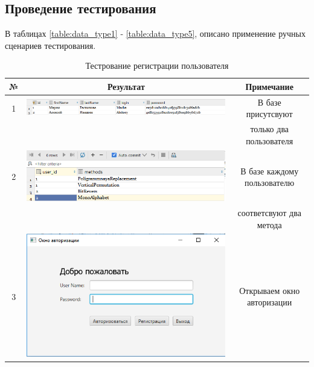 \documentclass[a4paper,12pt]{article}
\begin{document}
\newpage \subsection{Проведение тестирования}

В таблицах \ref{table:data_type1} - \ref{table:data_type5}, описано применение ручных сценариев тестирования.

\begin{table}[h]
	\caption{Тестрование регистрации пользователя}
	\centering
	\begin{tabular}{|c|c|c|}
	\hline 
	№  & Результат & Примечание \\ 
	\hline 
	1 & \includegraphics[scale=0.3]{img/database/before_registry_user.png} & В базе присутсвуют \\ && только два пользователя \\
	\hline 
	2 & \includegraphics[scale=0.3]{img/database/before_registry_methods.png} & В базе каждому пользователю \\ && соответсвуют два метода\\
	\hline 
	3 & \includegraphics[scale=0.3]{img/login_form.png} & Открываем окно авторизации\\
	\hline 

\end{tabular}
\end{table}
\end{document}
